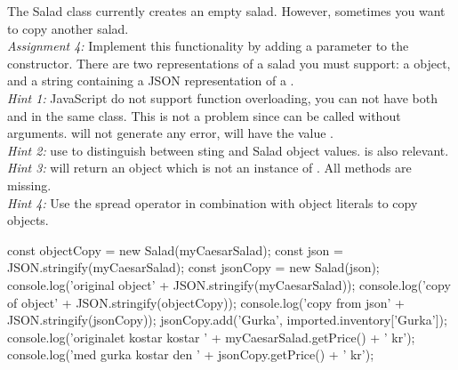 \documentclass[fleqn, article, a4paper]{memoir}
\begin{document}
\begin{Assignments}
\item The Salad class currently creates an empty salad. However, sometimes you want to copy another salad. 
\\ \emph{Assignment 4:} Implement this functionality by adding a parameter to the constructor. There are two representations of a salad you must support: a  object, and a string containing a JSON representation of a . 
\\\emph{Hint 1:} JavaScript do not support function overloading, you can not have both  and  in the same class. This is not a problem since  can be called without arguments.  will not generate any error,  will have the value .
\\\emph{Hint 2:} use  to distinguish between sting and Salad object values.  is also relevant.
\\\emph{Hint 3:}  will return an object which is not an instance of . All methods are missing.
\\\emph{Hint 4:} Use the spread operator in combination with object literals to copy objects.
\begin{Code}
const objectCopy = new Salad(myCaesarSalad);
const json = JSON.stringify(myCaesarSalad);
const jsonCopy = new Salad(json);
console.log('original object\n' + JSON.stringify(myCaesarSalad));
console.log('copy of object\n' + JSON.stringify(objectCopy));
console.log('copy from json\n' + JSON.stringify(jsonCopy));
jsonCopy.add('Gurka', imported.inventory['Gurka']);
console.log('originalet kostar kostar ' + myCaesarSalad.getPrice() + ' kr');
console.log('med gurka kostar den ' + jsonCopy.getPrice() + ' kr');
\end{Code}


\end{Assignments}
\end{document}
